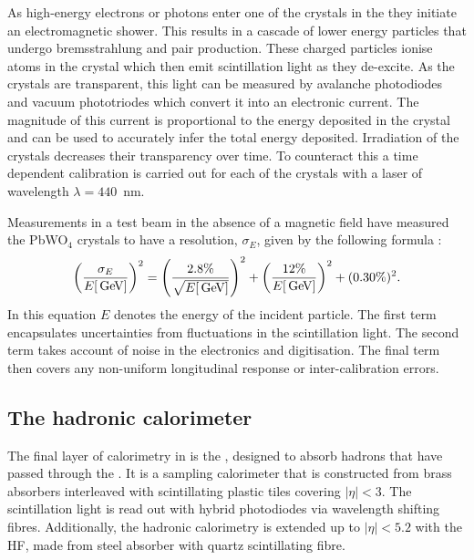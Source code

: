 As high-energy electrons or photons enter one of the crystals in the
\ECAL they initiate an electromagnetic shower. This results in a
cascade of lower energy particles that undergo bremsstrahlung and pair
production.  These charged particles ionise atoms in the crystal which
then emit scintillation light as they de-excite. As the crystals are
transparent, this light can be measured by avalanche photodiodes and
vacuum phototriodes which convert it into an electronic current. The
magnitude of this current is proportional to the energy deposited in
the crystal and can be used to accurately infer the total energy
deposited. Irradiation of the crystals decreases their transparency
over time. To counteract this a time dependent calibration is carried
out for each of the crystals with a laser of wavelength
$\lambda=440$~nm. 

Measurements in a test beam in the absence of a magnetic field have
measured the PbWO$_4$ crystals to have a resolution, $\sigma_E$, given
by the following formula \cite{1748-0221-2-04-P04004}:
\begin{equation} \label{eq:ecalres}
\left(\frac{\sigma_E}{E[\mathrm{\,Ge\kern -0.1em V}]}\right)^2=\left(\frac{2.8\%}
{\sqrt{E[\mathrm{\,Ge\kern -0.1em V}]}}\right)^2+\left(\frac{12\%}{E[\mathrm{\,Ge\kern -0.1em V}]}\right)^2+(0.30\%)^2.
\end{equation} 
In this equation $E$ denotes the energy of the incident
particle. The first term encapsulates uncertainties from fluctuations in the
scintillation light. The second term takes account of noise in the
electronics and digitisation. The final term then covers any
non-uniform longitudinal response or inter-calibration errors. 

\subsection{The hadronic calorimeter} 

The final layer of calorimetry in \CMS is the \HCAL \cite{CMS:HCAL},
designed to absorb hadrons that have passed through the \ECAL.
It is a sampling calorimeter that is constructed from brass absorbers
interleaved with scintillating plastic tiles covering $|\eta|<3$. The
scintillation light is read out with hybrid photodiodes via wavelength
shifting fibres.  Additionally, the hadronic calorimetry is extended
up to $|\eta|<5.2$ with the \ac{HF}, made from steel absorber with
quartz scintillating fibre. 

